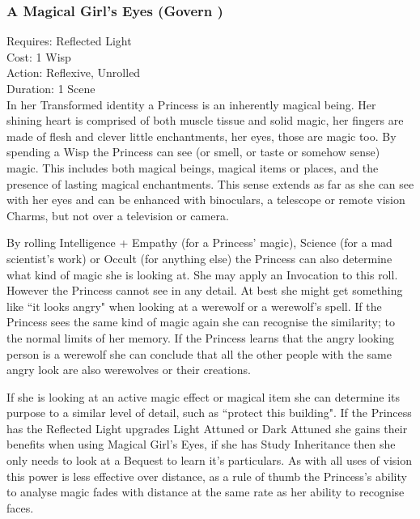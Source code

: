 \subsubsection*{A Magical Girl's Eyes (Govern \textbullet\textbullet\textbullet)}

\noindent Requires: Reflected Light\\

\noindent Cost: 1 Wisp\\

\noindent Action: Reflexive, Unrolled\\

\noindent Duration: 1 Scene\\

\noindent In her Transformed identity a Princess is an inherently magical being. Her shining heart is comprised of both muscle tissue and solid magic, her fingers are made of flesh and clever little enchantments, her eyes, those are magic too. By spending a Wisp the Princess can see (or smell, or taste or somehow sense) magic. This includes both magical beings, magical items or places, and the presence of lasting magical enchantments. This sense extends as far as she can see with her eyes and can be enhanced with binoculars, a telescope or remote vision Charms, but not over a television or camera.

By rolling Intelligence + Empathy (for a Princess' magic), Science (for a mad scientist's work) or Occult (for anything else) the Princess can also determine what kind of magic she is looking at. She may apply an Invocation to this roll. However the Princess cannot see in any detail. At best she might get something like \textquotedblleft it looks angry" when looking at a werewolf or a werewolf's spell. If the Princess sees the same kind of magic again she can recognise the similarity; to the normal limits of her memory. If the Princess learns that the angry looking person is a werewolf she can conclude that all the other people with the same angry look are also werewolves or their creations.

If she is looking at an active magic effect or magical item she can determine its purpose to a similar level of detail, such as \textquotedblleft protect this building". If the Princess has the Reflected Light upgrades Light Attuned or Dark Attuned she gains their benefits when using Magical Girl's Eyes, if she has Study Inheritance then she only needs to look at a Bequest to learn it's particulars. As with all uses of vision this power is less effective over distance, as a rule of thumb the Princess's ability to analyse magic fades with distance at the same rate as her ability to recognise faces.

